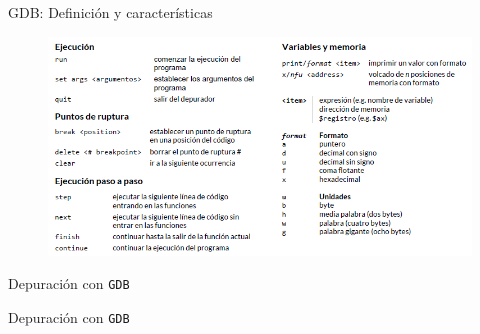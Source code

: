 \documentclass{beamer}
\begin{document}
\begin{frame}{GDB: Definición y características}
%



		\begin{figure}
			\includegraphics[width=\textwidth]{figuras/comandosGDB.PNG}
		\end{figure}
	\end{frame}




	\begin{frame}{Depuración con \texttt{GDB}}
	
	\end{frame}	

	\begin{frame}{Depuración con \texttt{GDB}}
	
	\end{frame}	
	
\end{document}
